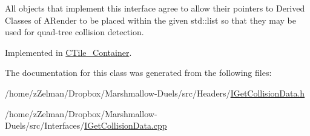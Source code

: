 All objects that implement this interface agree to allow their pointers to Derived Classes of A\-Render to be placed within the given std\-::list so that they may be used for quad-\/tree collision detection. 



Implemented in \hyperlink{classCTile__Container_ae61b573ed7b47bea750040a26b492632}{C\-Tile\-\_\-\-Container}.



The documentation for this class was generated from the following files\-:\begin{DoxyCompactItemize}
\item 
/home/z\-Zelman/\-Dropbox/\-Marshmallow-\/\-Duels/src/\-Headers/\hyperlink{IGetCollisionData_8h}{I\-Get\-Collision\-Data.\-h}\item 
/home/z\-Zelman/\-Dropbox/\-Marshmallow-\/\-Duels/src/\-Interfaces/\hyperlink{IGetCollisionData_8cpp}{I\-Get\-Collision\-Data.\-cpp}\end{DoxyCompactItemize}
